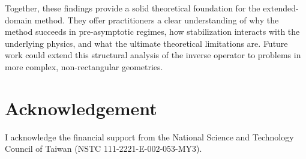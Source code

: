 \documentclass[pdflatex,sn-mathphys-num]{sn-jnl}%
\theoremstyle{thmstyleone}%
\begin{document}
Together, these findings provide a solid theoretical foundation for the extended-domain method. They offer practitioners a clear understanding of why the method succeeds in pre-asymptotic regimes, how stabilization interacts with the underlying physics, and what the ultimate theoretical limitations are. Future work could extend this structural analysis of the inverse operator to problems in more complex, non-rectangular geometries.

\section*{Acknowledgement}
I acknowledge the financial support from the National Science and Technology Council of Taiwan (NSTC 111-2221-E-002-053-MY3).





\end{document}
